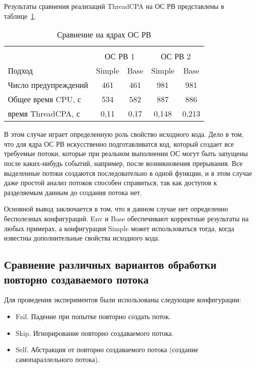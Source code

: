 Результаты сравнения реализаций ThreadCPA на ОС РВ представлены в таблице~\ref{table-os-thread}.

  \begin{table}[h]\footnotesize \centering
    \caption{Сравнение на ядрах ОС РВ}
  	\label{table-os-thread}
    \begin{tabular}{ | l | c | c | c | c |}
      \hline
      		& 		\multicolumn{4}{c|}{\combatmode}  \\
      		& 		\multicolumn{2}{c|}{ОС РВ 1} & \multicolumn{2}{c|}{ОС РВ 2} 	\\
      Подход         					& Simple 	& Base 	& Simple 	& Base 		\\ \hline
      Число предупреждений 				& 461    	& 461   & 981     	& 981  		\\ 
      Общее время CPU, с				& 534      	& 582   & 887     	& 886  		\\ 
  \hspace{0.5cm} время ThreadCPA, с 	& 0,11 		& 0,17  & 0,148    	& 0,213   	\\
      \hline
    \end{tabular}
  \end{table}

В этом случае играет определенную роль свойство исходного кода.
Дело в том, что для ядра ОС РВ искусственно подготавливатся код, который создает все требуемые потоки, которые при реальном выполнении ОС могут быть запущены после каких-нибудь событий, например, после возникновения прерывания.
Все выделенные потоки создаются последовательно в одной функции, и в этом случае даже простой анализ потоков способен справиться, так как доступов к разделяемым данным до создания потока нет.

Основной вывод заключается в том, что в данном случае нет определенно бесполезных конфигураций. 
Env и Base обеспечивают корректные результаты на любых примерах, а конфигурация Simple может использоваться тогда, когда известны дополнительные свойства исходного кода.


\subsection{Сравнение различных вариантов обработки повторно создаваемого потока }

Для проведения экспериментов были использованы следующие конфигурации:

\begin{itemize}
\item Fail. Падение при попытке повторно создать поток.
\item Skip. Игнорирование повторно создаваемого потока.
\item Self. Абстракция от повторно создаваемого потока (создание самопараллельного потока).
\end{itemize}

